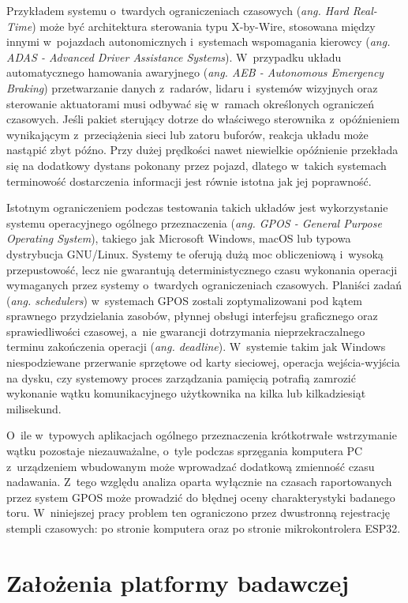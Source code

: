 Przykładem systemu o~twardych ograniczeniach czasowych (\textit{ang. Hard Real-Time}) może być architektura sterowania typu X-by-Wire, stosowana między innymi w~pojazdach autonomicznych i~systemach wspomagania kierowcy (\textit{ang. ADAS - Advanced Driver Assistance Systems}).
W~przypadku układu automatycznego hamowania awaryjnego (\textit{ang. AEB - Autonomous Emergency Braking}) przetwarzanie danych z~radarów, lidaru i~systemów wizyjnych oraz sterowanie aktuatorami musi odbywać się w~ramach określonych ograniczeń czasowych.
Jeśli pakiet sterujący dotrze do właściwego sterownika z~opóźnieniem wynikającym z~przeciążenia sieci lub zatoru buforów, reakcja układu może nastąpić zbyt późno.
Przy dużej prędkości nawet niewielkie opóźnienie przekłada się na dodatkowy dystans pokonany przez pojazd, dlatego w~takich systemach terminowość dostarczenia informacji jest równie istotna jak jej poprawność.

Istotnym ograniczeniem podczas testowania takich układów jest wykorzystanie systemu operacyjnego ogólnego przeznaczenia (\textit{ang. GPOS - General Purpose Operating System}), takiego jak Microsoft Windows, macOS lub typowa dystrybucja GNU/Linux.
Systemy te oferują dużą moc obliczeniową i~wysoką przepustowość, lecz nie gwarantują deterministycznego czasu wykonania operacji wymaganych przez systemy o~twardych ograniczeniach czasowych.
Planiści zadań (\textit{ang. schedulers}) w~systemach GPOS zostali zoptymalizowani pod kątem sprawnego przydzielania zasobów, płynnej obsługi interfejsu graficznego oraz sprawiedliwości czasowej, a~nie gwarancji dotrzymania nieprzekraczalnego terminu zakończenia operacji (\textit{ang. deadline}).
W~systemie takim jak Windows niespodziewane przerwanie sprzętowe od karty sieciowej, operacja wejścia-wyjścia na dysku, czy systemowy proces zarządzania pamięcią potrafią zamrozić wykonanie wątku komunikacyjnego użytkownika na kilka lub kilkadziesiąt milisekund.

O~ile w~typowych aplikacjach ogólnego przeznaczenia krótkotrwałe wstrzymanie wątku pozostaje niezauważalne, o~tyle podczas sprzęgania komputera PC z~urządzeniem wbudowanym może wprowadzać dodatkową zmienność czasu nadawania.
Z~tego względu analiza oparta wyłącznie na czasach raportowanych przez system GPOS może prowadzić do błędnej oceny charakterystyki badanego toru.
W~niniejszej pracy problem ten ograniczono przez dwustronną rejestrację stempli czasowych: po stronie komputera oraz po stronie mikrokontrolera ESP32.

\section{Założenia platformy badawczej}

